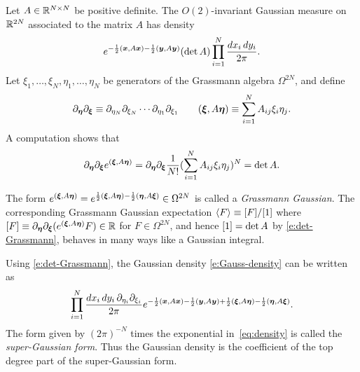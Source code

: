 \documentclass[11pt,a4paper]{article}
\begin{document}
Let $A \in \mathbb{R}^{N\times N}$ be positive definite.  The $O(2)$-invariant
Gaussian measure on $\mathbb{R}^{2N}$ associated to the matrix $A$ has density
\begin{equation} 
  \label{e:Gauss-density}
  e^{-\frac12(\boldsymbol{x},A\boldsymbol{x})-\frac12(\boldsymbol{y},A\boldsymbol{y})} (\det A) \prod_{i=1}^N \frac{dx_i \, dy_i}{2\pi}.
\end{equation}
Let $\xi_1, \dots, \xi_N, \eta_1, \dots, \eta_N$ be generators of the
Grassmann algebra $\Omega^{2N}$, and define
  \begin{equation}
    \label{eq:det-G-pre}
    \partial_{\boldsymbol{\eta}} \partial_{\boldsymbol{\xi}}
    \equiv \partial_{\eta_N} \partial_{\xi_N}
    \cdots \partial_{\eta_1} \partial_{\xi_1}  \qquad
    (\boldsymbol{\xi},A\boldsymbol{\eta}) \equiv \sum_{i=1}^N A_{ij} \xi_i\eta_j.
  \end{equation}
A computation shows that
\begin{equation} \label{e:det-Grassmann}
  \partial_{\boldsymbol{\eta}} \partial_{\boldsymbol{\xi}} e^{(\boldsymbol{\xi},A\boldsymbol{\eta})}
  = \partial_{\boldsymbol{\eta}} \partial_{\boldsymbol{\xi}} \frac{1}{N!}
  (\sum_{i=1}^{N}A_{ij}\xi_{i}\eta_{j})^{N} = 
  \det A .
\end{equation}
\begin{remark}
  \label{rem:GG}
  The form
  $e^{(\boldsymbol{\xi},A\boldsymbol{\eta})} = e^{\frac12(\boldsymbol{\xi},A\boldsymbol{\eta})-\frac12
    (\boldsymbol{\eta},A\boldsymbol{\xi})} \in\Omega^{2N}$ is called a
  \emph{Grassmann Gaussian}.  The corresponding Grassmann Gaussian
  expectation $\langle F \rangle \equiv [{F}]/[{1}]$ where
  $[{F}]\equiv\partial_{\boldsymbol{\eta}} \partial_{\boldsymbol{\xi}}
  (e^{(\boldsymbol{\xi},A\boldsymbol{\eta})}F) \in \mathbb{R}$ for $F \in \Omega^{2N}$, and
  hence $[{1}]=\det A$ by \eqref{e:det-Grassmann}, behaves in many
  ways like a Gaussian integral.
\end{remark}
Using \eqref{e:det-Grassmann}, the Gaussian density
\eqref{e:Gauss-density} can be written as
\begin{equation}
  \label{eq:density}
  \prod_{i=1}^N \frac{dx_i \, dy_i \, \partial_{\eta_i} \partial_{\xi_i}} {2\pi}
  e^{-\frac12(\boldsymbol{x},A\boldsymbol{x})-\frac12(\boldsymbol{y},A\boldsymbol{y})+\frac12(\boldsymbol{\xi},A\boldsymbol{\eta})-\frac12 (\boldsymbol{\eta},A\boldsymbol{\xi})}
  .
\end{equation}
The form given by $(2\pi)^{-N}$ times the exponential
in~\eqref{eq:density} is called the \emph{super-Gaussian form}.  Thus
the Gaussian density is the coefficient of the top degree part of the
super-Gaussian form.
 
\end{document}
